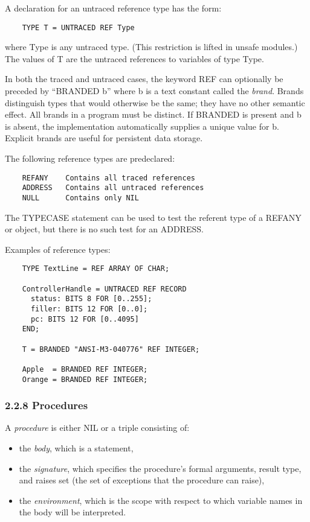 \documentclass[10pt]{article}
\begin{document}
A declaration for an untraced reference type has the form:
\begin{verbatim}
    TYPE T = UNTRACED REF Type
\end{verbatim}
where Type is any untraced type.  (This restriction is lifted in unsafe
modules.) The values of T are the untraced references to variables of type
Type.

In both the traced and untraced cases, the keyword REF can optionally be
preceded by ``BRANDED b'' where b is a text constant called the \emph{brand}.
Brands distinguish types that would otherwise be the same; they have no other
semantic effect.  All brands in a program must be distinct.  If BRANDED is
present and b is absent, the implementation automatically supplies a unique
value for b.  Explicit brands are useful for persistent data storage.

The following reference types are predeclared:
\begin{verbatim}
    REFANY    Contains all traced references
    ADDRESS   Contains all untraced references
    NULL      Contains only NIL
\end{verbatim}
The TYPECASE statement can be used to test the referent type of a REFANY or
object, but there is no such test for an ADDRESS.

Examples of reference types:
\begin{verbatim}
    TYPE TextLine = REF ARRAY OF CHAR;

    ControllerHandle = UNTRACED REF RECORD
      status: BITS 8 FOR [0..255];
      filler: BITS 12 FOR [0..0];
      pc: BITS 12 FOR [0..4095]
    END;

    T = BRANDED "ANSI-M3-040776" REF INTEGER;

    Apple  = BRANDED REF INTEGER;
    Orange = BRANDED REF INTEGER;
\end{verbatim}

\subsubsection*{2.2.8 Procedures}

A \emph{procedure} is either NIL or a triple consisting of:
\begin{itemize}
\item the \emph{body}, which is a statement,
\item the \emph{signature}, which specifies the procedure's formal arguments,
  result type, and raises set (the set of exceptions that the procedure can
  raise),
\item the \emph{environment}, which is the scope with respect to which
  variable names in the body will be interpreted.
\end{itemize}
\end{document}
